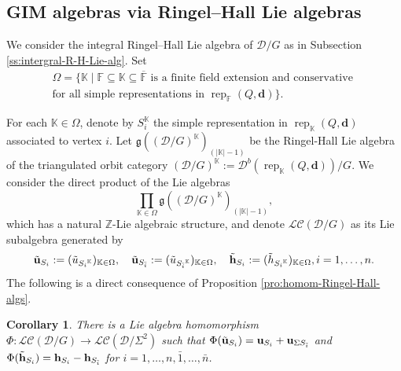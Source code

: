\documentclass[12pt,reqno]{amsart}
\numberwithin{equation}{section}
\newcommand{\rep}{\operatorname{rep}\nolimits}
\def \ov{\overline}
\newtheorem{corollary}[theorem]{Corollary}
\newtheorem{remark}[theorem]{Remark}
\begin{document}
	
	
	\subsection{GIM algebras via Ringel--Hall Lie algebras}\label{ss:main result GIM}
	We consider the integral Ringel--Hall Lie algebra of $\mathcal{D}/G$ as in Subsection \ref{ss:intergral-R-H-Lie-alg}.
	Set
	\[
	\begin{aligned}
		\Omega = \{ \mathbb{K} \mid \mathbb{F} \subseteq \mathbb{K} \subseteq \ov{\mathbb{F}} \text{ is a finite field extension and conservative } \\
		\text{for all simple representations in } \rep_{\mathbb{F}}(Q,\mathbf{d}) \}.
	\end{aligned}
	\]
	
	For each $\mathbb{K}\in \Omega$, denote by $S_i^{\mathbb{K}}$ the simple representation in $\rep_{\mathbb{K}}(Q,\mathbf{d})$ associated to vertex $i$.
	Let $\mathfrak{g}((\mathcal{D}/G)^\mathbb{K})_{(|\mathbb{K}|-1)}$ be the Ringel-Hall Lie algebra of the triangulated orbit category $(\mathcal{D}/G)^\mathbb{K}:=\mathcal{D}^b(\rep_{\mathbb{K}}(Q,\mathbf{d}))/G$.
	We consider the direct product of the Lie algebras \[\prod_{\mathbb{K}\in \Omega} \mathfrak{g}((\mathcal{D}/G)^\mathbb{K})_{(|\mathbb{K}|-1)},\] which has a natural $\mathbb{Z}$-Lie algebraic structure, and denote $\mathscr{LC}(\mathcal{D}/G)$ as its Lie subalgebra generated by 
	\[
	\tilde{\bf u}_{S_i}:=(\tilde{u}_{{S_i}^\mathbb{K}})_{\mathbb{K}\in\Omega},\quad
	\tilde{\bf u}_{S_{\bar{i}}}:=
	(\tilde{ u}_{ {S_{\bar{i}}}^\mathbb{K}})_{\mathbb{K}\in\Omega},\quad
	\tilde{\bf h}_{S_i}:=(\tilde{h}_{{S_i}^\mathbb{K}})_{\mathbb{K}\in\Omega}
	,i=1,\dots,n.  
	\]
	The following is a direct consequence of Proposition \ref{pro:homom-Ringel-Hall-algs}.
	\begin{corollary}
		There is a Lie algebra homomorphism $ \Phi:\mathscr{LC}(\mathcal{D}/G)\rightarrow \mathscr{LC}(\mathcal{D}/\Sigma^2)$ such that $\Phi(\tilde{\bf u}_{S_i})={\bf u}_{S_i}+{\bf u}_{\Sigma S_{\bar{i}}}$
		and $\Phi(\tilde{\bf h}_{S_i})={\bf h}_{S_i}-{\bf h}_{S_{\bar{i}}}$ for $ i=1,\ldots,n,\bar{1},\ldots,\bar{n}$.
	\end{corollary}
	
\end{document}
